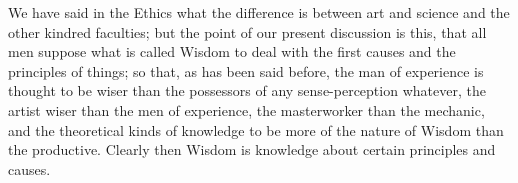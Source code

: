 \documentclass{article}
\begin{document}
We have said in the Ethics what the difference is between art and science and the other kindred faculties; but the point of our present discussion is this, that all men suppose what is called Wisdom to deal with the first causes and the principles of things; so that, as has been said before, the man of experience is thought to be wiser than the possessors of any sense-perception whatever, the artist wiser than the men of experience, the masterworker than the mechanic, and the theoretical kinds of knowledge to be more of the nature of Wisdom than the productive. Clearly then Wisdom is knowledge about certain principles and causes.
\end{document}

